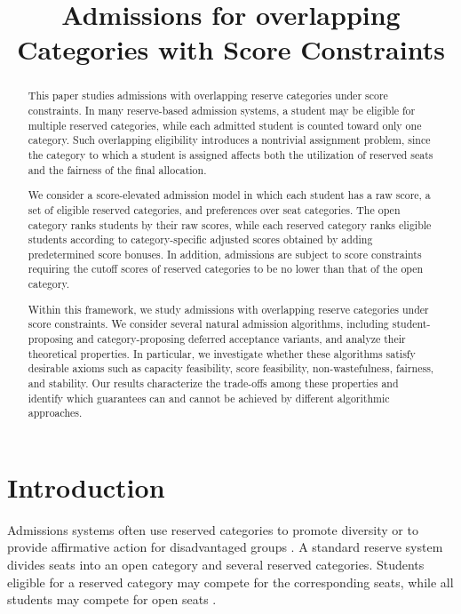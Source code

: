 \documentclass[10pt]{article}
\title{Admissions for overlapping Categories with Score Constraints}
\author{}
\date{}
\newcommand{\1}{\mathbf{1}}
\begin{document}
\maketitle
\vspace{-2em}

\begin{abstract}
This paper studies admissions with overlapping reserve categories under score constraints. In many reserve-based admission systems, a student may be eligible for multiple reserved categories, while each admitted student is counted toward only one category. Such overlapping eligibility introduces a nontrivial assignment problem, since the category to which a student is assigned affects both the utilization of reserved seats and the fairness of the final allocation.

We consider a score-elevated admission model in which each student has a raw score, a set of eligible reserved categories, and preferences over seat categories. The open category ranks students by their raw scores, while each reserved category ranks eligible students according to category-specific adjusted scores obtained by adding predetermined score bonuses. In addition, admissions are subject to score constraints requiring the cutoff scores of reserved categories to be no lower than that of the open category.

Within this framework, we study admissions with overlapping reserve categories under score constraints. We consider several natural admission algorithms, including student-proposing and category-proposing deferred acceptance variants, and analyze their theoretical properties. In particular, we investigate whether these algorithms satisfy desirable axioms such as capacity feasibility, score feasibility, non-wastefulness, fairness, and stability. Our results characterize the trade-offs among these properties and identify which guarantees can and cannot be achieved by different algorithmic approaches.
\end{abstract}

\section{Introduction}


Admissions systems often use reserved categories to promote diversity or to provide affirmative action for disadvantaged groups \citep{Abdu05a,AyTu20a,AyBo21a}. A standard reserve system divides seats into an open category and several reserved categories. Students eligible for a reserved category may compete for the corresponding seats, while all students may compete for open seats \citep{Abdu05a,AyTu23a}.
\end{document}
